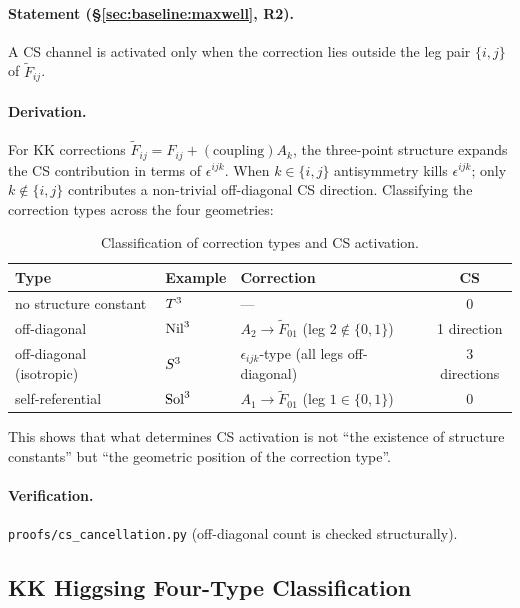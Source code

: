 \paragraph{Statement (\S\ref{sec:baseline:maxwell}, R2).}
A CS channel is activated only when the correction lies outside the leg pair
$\{i,j\}$ of $\tilde{F}_{ij}$.

\paragraph{Derivation.}
For KK corrections $\tilde{F}_{ij} = F_{ij} + (\text{coupling}) A_k$, the
three-point structure expands the CS contribution in terms of
$\epsilon^{ijk}$.  When $k\in\{i,j\}$ antisymmetry kills $\epsilon^{ijk}$;
only $k\notin\{i,j\}$ contributes a non-trivial off-diagonal CS direction.
Classifying the correction types across the four geometries:

\begin{table}[H]
\centering
\begin{tabular}{lllc}
\toprule
Type & Example & Correction & CS \\
\midrule
no structure constant & $T^3$ & --- & 0 \\
off-diagonal & $\mathrm{Nil}^3$ & $A_2\to\tilde{F}_{01}$ (leg $2\notin\{0,1\}$) & 1 direction \\
off-diagonal (isotropic) & $S^3$ & $\epsilon_{ijk}$-type (all legs off-diagonal) & 3 directions \\
self-referential & $\mathrm{Sol}^3$ & $A_1\to\tilde{F}_{01}$ (leg $1\in\{0,1\}$) & 0 \\
\bottomrule
\end{tabular}
\caption{Classification of correction types and CS activation.}
\label{tab:appE_offdiag}
\end{table}

This shows that what determines CS activation is not ``the existence of
structure constants'' but ``the geometric position of the correction type''.

\paragraph{Verification.}
\texttt{proofs/cs\_cancellation.py} (off-diagonal count is checked
structurally).

\subsection{KK Higgsing Four-Type Classification}
\label{app:E:E5}

